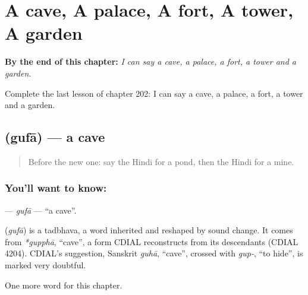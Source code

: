 
\chapter{A cave, A palace, A fort, A tower, A garden}
\label{ch:hi-a-cave-a-palace-a-fort-a-tower-a-garden}

\begin{chapteropening}
\textbf{By the end of this chapter:} \emph{I can say a cave, a palace, a fort, a tower and a garden.}

Complete the last lesson of chapter 202: I can say a cave, a palace, a fort, a tower and a garden.
\end{chapteropening}

\section[\texorpdfstring{\hi{गुफ़ा} (gufā)}{गुफ़ा (gufā)}]{ (gufā) — a cave}

\label{lesson:HI-C202-gufa}



\begin{quote}
Before the new one: say the Hindi for a pond, then the Hindi for a mine.
\end{quote}

\subsection*{You'll want to know: }
\textbf{} — \emph{gufā} — \textquotedblleft{}a cave\textquotedblright{}.

\begin{cousinweb}
\textbf{} (\emph{gufā}) is a tadbhava, a word inherited and reshaped by sound change. It comes from \emph{*gupphā}, \textquotedblleft{}cave\textquotedblright{}, a form CDIAL reconstructs from its descendants (CDIAL 4204). CDIAL's suggestion, Sanskrit \emph{guhā}, \textquotedblleft{}cave\textquotedblright{}, crossed with \emph{gup-}, \textquotedblleft{}to hide\textquotedblright{}, is marked very doubtful.
\end{cousinweb}

\begin{grammarlens}[title={What you've built}]
One more word for this chapter.
\end{grammarlens}

